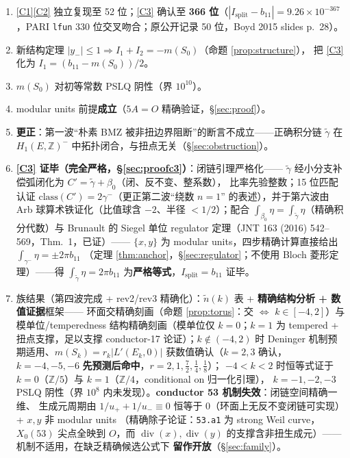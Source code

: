 \documentclass[11pt,a4paper]{ctexart}
\theoremstyle{remark}
\newcommand{\diver}{\mathop{\mathrm{div}}}
\newcommand{\ZZ}{\mathbb{Z}}
\newcommand{\bN}{b_{11}}
\newcommand{\Isplit}{I_{\mathrm{split}}}
\begin{document}
\begin{enumerate}
\item \eqref{C1}\eqref{C2} 独立复现至 52 位；\eqref{C3} 确认至 \textbf{366 位}（$|\Isplit-\bN|=9.26\times10^{-367}$，PARI \texttt{lfun} 330 位交叉吻合；原公开记录 50 位，Boyd 2015 slides p.~28）。
\item 新结构定理 $|y_-|\le1\Rightarrow I_1+I_2=-m(S_0)$（命题 \ref{prop:structure}），
把 \eqref{C3} 化为 $I_1=(\bN-m(S_0))/2$。
\item $m(S_0)$ 对初等常数 PSLQ 阴性（界 $10^{10}$）。
\item modular units 前提\textbf{成立}（$5A=O$ 精确验证，\S\ref{sec:proof}）。
\item \textbf{更正}：第一波“朴素 BMZ 被非扭边界阻断”的断言不成立——正确积分链
$\tilde\gamma$ 在 $H_1(E,\ZZ)^-$ 中拓扑闭合，与扭点无关（\S\ref{sec:obstruction}）。
\item \textbf{\eqref{C3} 证毕（完全严格，\S\ref{sec:proofc3}）}：闭链引理严格化——
$\tilde\gamma$ 经小分支补偿弧闭化为 $C'=\tilde\gamma+\beta_0$（闭、反不变、整系数），
比率先验整数；15 位匹配认证 $\mathrm{class}(C')=2\gamma^-$（更正第二波``绕数 $n=1$''
的表述），并于第六波由 Arb 球算术铁证化（比值球含 $-2$、半径 $<1/2$）；配合
$\int_{\beta_0}\eta=\int_{\tilde\gamma}\eta$（精确积分代数）与
Brunault 的 Siegel 单位 regulator 定理（JNT 163 (2016) 542--569，Thm.~1，已证）——
$\{x,y\}$ 为 modular units，四步精确计算直接给出 $\int_{\gamma^-}\eta=\pm2\pi\bN$
（定理 \ref{thm:anchor}，\S\ref{sec:regulator}；不使用 Bloch 菱形定理）——得
$\int_{\tilde\gamma}\eta=2\pi\bN$ 为\textbf{严格等式}，$I_{\mathrm{split}}=\bN$ 证毕。
\item 族结果（第四波完成 + rev2/rev3 精确化）：$\tilde n(k)$ 表 + \textbf{精确结构分析 + 数值证据}框架——
环面交精确刻画（命题 \ref{prop:torus}：交 $\Longleftrightarrow$ $k\in[-4,2]$）与
模单位/temperedness 结构精确刻画（模单位仅 $k=0$；$k=1$ 为 tempered + 扭点支撑，足以支撑
conductor-17 论证）；$k\notin(-4,2)$ 时 Deninger 机制预期适用、$m(S_k)=r_k|L'(E_k,0)|$
获数值确认（$k=2,3$ 确认，$k=-4,-5,-6$ \textbf{先预测后命中}，$r=2,1,\frac72,\frac14,\frac18$）；
$-4<k<2$ 时恒等式证于 $k=0$（$\ZZ/5$）与 $k=1$（$\ZZ/4$，conditional on 归一化引理），
$k=-1,-2,-3$ PSLQ 阴性（界 $10^8$ 内未发现）。\textbf{conductor 53 机制失效}：闭链空间精确一维、
生成元周期由
$1/u_++1/u_-\equiv0$ 恒等于 0（环面上无反不变闭链可实现）+ $x,y$ 非 modular units
（精确除子论证：\texttt{53.a1} 为 strong Weil curve，$X_0(53)$ 尖点全映到 $O$，而
$\diver(x),\diver(y)$ 的支撑含非扭生成元）——机制不适用，在缺乏精确候选公式下
\textbf{留作开放}（\S\ref{sec:family}）。

\end{enumerate}
\end{document}
